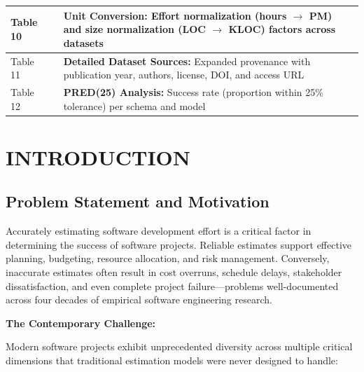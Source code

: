 \documentclass[11pt,a4paper]{article}
\begin{document}
\begin{tabular}{|p{}|p{}|p{}|}
\hline
Table 10 & \pageref{tab:unit-conversion} & \textbf{Unit Conversion:} Effort normalization (hours $\to$ PM) and size normalization (LOC $\to$ KLOC) factors across datasets \\
\hline
Table 11 & \pageref{tab:dataset-sources} & \textbf{Detailed Dataset Sources:} Expanded provenance with publication year, authors, license, DOI, and access URL \\
\hline
Table 12 & \pageref{tab:pred25} & \textbf{PRED(25) Analysis:} Success rate (proportion within 25\% tolerance) per schema and model \\
\hline
\end{tabular}

\newpage

\section{INTRODUCTION}

\subsection{Problem Statement and Motivation}

Accurately estimating software development effort is a critical factor in determining the success of software projects. Reliable estimates support effective planning, budgeting, resource allocation, and risk management. Conversely, inaccurate estimates often result in cost overruns, schedule delays, stakeholder dissatisfaction, and even complete project failure---problems well-documented across four decades of empirical software engineering research.

\textbf{The Contemporary Challenge:}

Modern software projects exhibit unprecedented diversity across multiple critical dimensions that traditional estimation models were never designed to handle:
\end{document}
